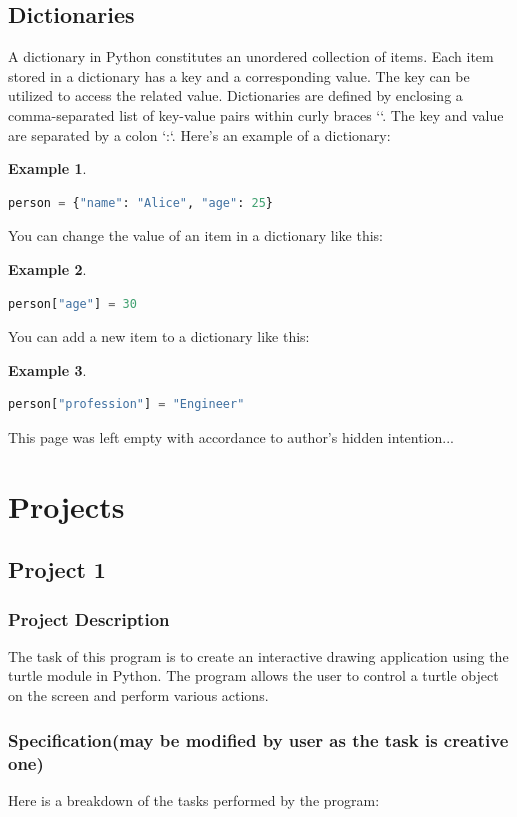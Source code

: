 \documentclass[12pt]{article}
\newtheorem{Example}{Example}[section]
\begin{document}
\subsection{Dictionaries}
A dictionary in Python constitutes an unordered collection of items. Each item stored in a dictionary has a key and a corresponding value. The key can be utilized to access the related value. Dictionaries are defined by enclosing a comma-separated list of key-value pairs within curly braces `{}`. The key and value are separated by a colon `:`. Here's an example of a dictionary:
\begin{Example}
\begin{lstlisting}[language=Python]
person = {"name": "Alice", "age": 25}
\end{lstlisting}
\end{Example}
You can change the value of an item in a dictionary like this:
\begin{Example}
\begin{lstlisting}[language=Python]
person["age"] = 30
\end{lstlisting}
\end{Example}
You can add a new item to a dictionary like this:
\begin{Example}
\begin{lstlisting}[language=Python]
person["profession"] = "Engineer"
\end{lstlisting}
\end{Example}

\newpage
\begin{center}
 This page was left empty with accordance to author's hidden intention...
\end{center}
\newpage
\section{Projects}
\subsection{Project 1}
\subsubsection{Project Description}

The task of this program is to create an interactive drawing application using the turtle module in Python. The program allows the user to control a turtle object on the screen and perform various actions. 

\subsubsection{Specification(may be modified by user as the task is creative one)}
Here is a breakdown of the tasks performed by the program:
\end{document}
